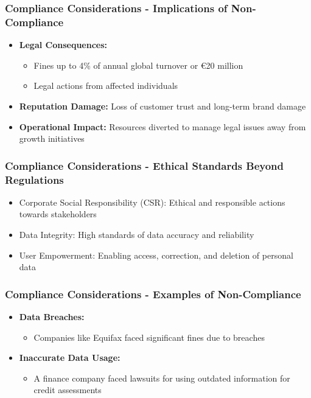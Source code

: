\documentclass[aspectratio=169]{beamer}
\begin{document}
\begin{frame}[fragile]
    \frametitle{Compliance Considerations - Implications of Non-Compliance}
    \begin{itemize}
        \item \textbf{Legal Consequences:} 
        \begin{itemize}
            \item Fines up to 4\% of annual global turnover or €20 million
            \item Legal actions from affected individuals
        \end{itemize}
        \item \textbf{Reputation Damage:} Loss of customer trust and long-term brand damage
        \item \textbf{Operational Impact:} Resources diverted to manage legal issues away from growth initiatives
    \end{itemize}
\end{frame}

\begin{frame}[fragile]
    \frametitle{Compliance Considerations - Ethical Standards Beyond Regulations}
    \begin{itemize}
        \item Corporate Social Responsibility (CSR): Ethical and responsible actions towards stakeholders
        \item Data Integrity: High standards of data accuracy and reliability
        \item User Empowerment: Enabling access, correction, and deletion of personal data
    \end{itemize}
\end{frame}

\begin{frame}[fragile]
    \frametitle{Compliance Considerations - Examples of Non-Compliance}
    \begin{itemize}
        \item \textbf{Data Breaches:} 
        \begin{itemize}
            \item Companies like Equifax faced significant fines due to breaches
        \end{itemize}
        \item \textbf{Inaccurate Data Usage:} 
        \begin{itemize}
            \item A finance company faced lawsuits for using outdated information for credit assessments
        \end{itemize}
    \end{itemize}
\end{frame}
\end{document}
